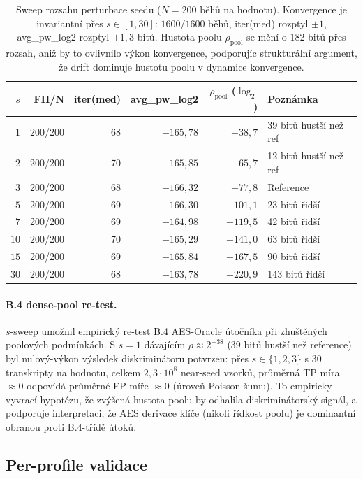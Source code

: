 \documentclass[11pt,a4paper]{article}
\begin{document}
\begin{table}[ht]
\centering
\small
\begin{tabular}{rrrrrl}
\toprule
$s$ & FH/N & iter(med) & avg\_pw\_log2 & $\rho_\text{pool}$ ($\log_2$) & Poznámka \\
\midrule
$1$ & 200/200 & 68 & $-165{,}78$ & $-38{,}7$ & 39 bitů hustší než ref \\
$2$ & 200/200 & 70 & $-165{,}85$ & $-65{,}7$ & 12 bitů hustší než ref \\
$3$ & 200/200 & 68 & $-166{,}32$ & $-77{,}8$ & Reference \\
$5$ & 200/200 & 69 & $-166{,}30$ & $-101{,}1$ & 23 bitů řidší \\
$7$ & 200/200 & 69 & $-164{,}98$ & $-119{,}5$ & 42 bitů řidší \\
$10$ & 200/200 & 70 & $-165{,}29$ & $-141{,}0$ & 63 bitů řidší \\
$15$ & 200/200 & 69 & $-165{,}84$ & $-167{,}5$ & 90 bitů řidší \\
$30$ & 200/200 & 68 & $-163{,}78$ & $-220{,}9$ & 143 bitů řidší \\
\bottomrule
\end{tabular}
\caption{Sweep rozsahu perturbace seedu ($N = 200$ běhů na hodnotu). Konvergence je invariantní přes $s \in [1, 30]$: $1600/1600$ běhů, iter(med) rozptyl $\pm 1$, avg\_pw\_log2 rozptyl $\pm 1{,}3$ bitů. Hustota poolu $\rho_\text{pool}$ se mění o $182$ bitů přes rozsah, aniž by to ovlivnilo výkon konvergence, podporujíc strukturální argument, že drift dominuje hustotu poolu v dynamice konvergence.}
\label{tab:seed-sweep}
\end{table}

\paragraph{B.4 dense-pool re-test.} $s$-sweep umožnil empirický re-test B.4 AES-Oracle útočníka při zhuštěných poolových podmínkách. S $s = 1$ dávajícím $\rho \approx 2^{-38}$ ($39$ bitů hustší než reference) byl nulový-výkon výsledek diskriminátoru potvrzen: přes $s \in \{1, 2, 3\}$ s $30$ transkripty na hodnotu, celkem $2{,}3 \cdot 10^{8}$ near-seed vzorků, průměrná TP míra $\approx 0$ odpovídá průměrné FP míře $\approx 0$ (úroveň Poisson šumu). To empiricky vyvrací hypotézu, že zvýšená hustota poolu by odhalila diskriminátorský signál, a podporuje interpretaci, že AES derivace klíče (nikoli řídkost poolu) je dominantní obranou proti B.4-třídě útoků.

\subsection{Per-profile validace}\label{sec:empirical-profiles}
\end{document}
